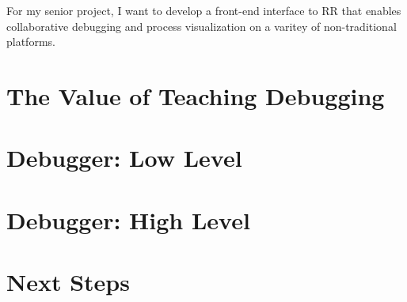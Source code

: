 \documentclass[12pt, twocolumn]{article}
\begin{document}
For my senior project, I want to develop a front-end interface to RR
that enables collaborative debugging and process visualization on a
varitey of non-traditional platforms.

\section{The Value of Teaching Debugging}



\section{Debugger: Low Level}

\section{Debugger: High Level}

\section{Next Steps}

\pagebreak

{}
\end{document}
